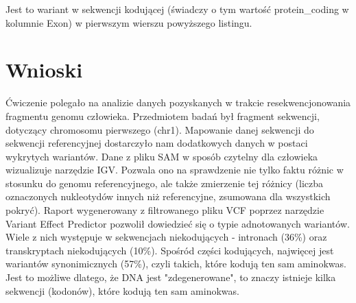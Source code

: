 \documentclass[a4paper]{article}
\begin{document}
Jest to wariant w sekwencji kodującej (świadczy o tym wartość protein\_coding w kolumnie Exon) w pierwszym wierszu powyższego listingu.

\section{Wnioski}
Ćwiczenie polegało na analizie danych pozyskanych w trakcie resekwencjonowania fragmentu genomu człowieka. Przedmiotem badań był fragment sekwencji, dotyczący chromosomu pierwszego (chr1). Mapowanie danej sekwencji do sekwencji referencyjnej dostarczyło nam dodatkowych danych w postaci wykrytych wariantów. Dane z pliku SAM w sposób czytelny dla człowieka wizualizuje narzędzie IGV. Pozwala ono na sprawdzenie nie tylko faktu różnic w stosunku do genomu referencyjnego, ale także zmierzenie tej różnicy (liczba oznaczonych nukleotydów innych niż referencyjne, zsumowana dla wszystkich pokryć). Raport wygenerowany z filtrowanego pliku VCF poprzez narzędzie Variant Effect Predictor pozwolił dowiedzieć się o typie adnotowanych wariantów. Wiele z nich występuje w sekwencjach niekodujących - intronach (36\%) oraz transkryptach niekodujących (10\%). Spośród części kodujących, najwięcej jest wariantów synonimicznych (57\%), czyli takich, które kodują ten sam aminokwas. Jest to możliwe dlatego, że DNA jest "zdegenerowane", to znaczy istnieje kilka sekwencji (kodonów), które kodują ten sam aminokwas.
\end{document}

